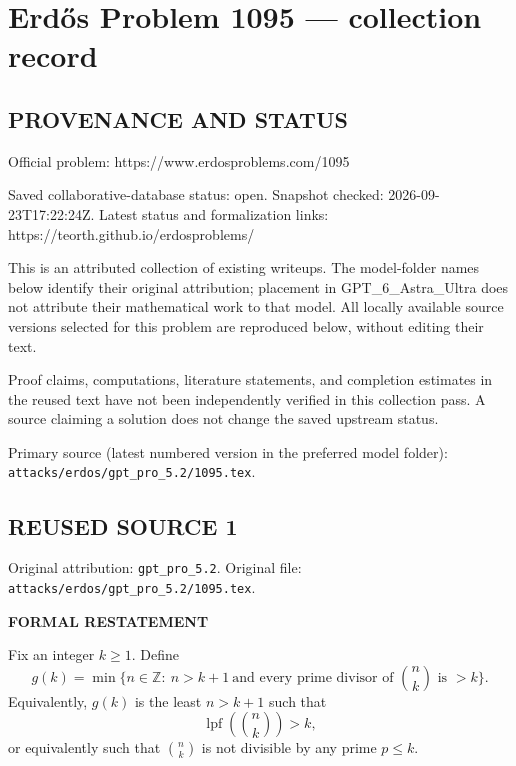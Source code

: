 \section*{Erd\H{o}s Problem 1095 --- collection record}

\subsection*{PROVENANCE AND STATUS}
Official problem: https://www.erdosproblems.com/1095

Saved collaborative-database status: open.
Snapshot checked: 2026-09-23T17:22:24Z.
Latest status and formalization links: https://teorth.github.io/erdosproblems/

This is an attributed collection of existing writeups. The model-folder names below identify their original attribution; placement in GPT\_6\_Astra\_Ultra does not attribute their mathematical work to that model. All locally available source versions selected for this problem are reproduced below, without editing their text.

Proof claims, computations, literature statements, and completion estimates in the reused text have not been independently verified in this collection pass. A source claiming a solution does not change the saved upstream status.

Primary source (latest numbered version in the preferred model folder): \texttt{attacks/erdos/gpt\_pro\_5.2/1095.tex}.

\subsection*{REUSED SOURCE 1}
Original attribution: \texttt{gpt\_pro\_5.2}.
Original file: \texttt{attacks/erdos/gpt\_pro\_5.2/1095.tex}.


\medskip
\noindent\textbf{FORMAL RESTATEMENT}

\smallskip
\noindent
Fix an integer $k\ge 1$. Define
\[
 g(k)=\min\Big\{n\in\mathbb{Z}:\ n>k+1\ \text{and every prime divisor of }\binom{n}{k}\text{ is }>k\Big\}.
\]
Equivalently, $g(k)$ is the least $n>k+1$ such that
\[
\operatorname{lpf}\!\left(\binom{n}{k}\right)>k,
\]
or equivalently such that $\binom{n}{k}$ is not divisible by any prime $p\le k$.

